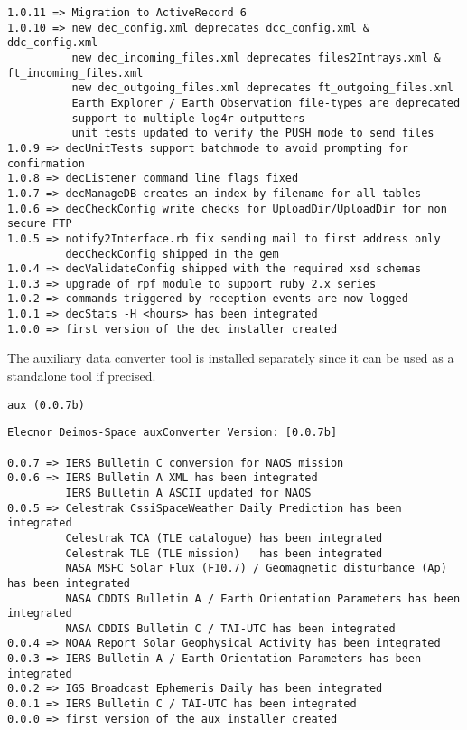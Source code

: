 \documentclass[dec_sum_main.tex]{subfiles}
\begin{document}
\begin{Verbatim}[tabsize=4]
1.0.11 => Migration to ActiveRecord 6
1.0.10 => new dec_config.xml deprecates dcc_config.xml & ddc_config.xml
          new dec_incoming_files.xml deprecates files2Intrays.xml & ft_incoming_files.xml
          new dec_outgoing_files.xml deprecates ft_outgoing_files.xml
          Earth Explorer / Earth Observation file-types are deprecated
          support to multiple log4r outputters
          unit tests updated to verify the PUSH mode to send files
1.0.9 => decUnitTests support batchmode to avoid prompting for confirmation
1.0.8 => decListener command line flags fixed
1.0.7 => decManageDB creates an index by filename for all tables
1.0.6 => decCheckConfig write checks for UploadDir/UploadDir for non secure FTP
1.0.5 => notify2Interface.rb fix sending mail to first address only 
         decCheckConfig shipped in the gem
1.0.4 => decValidateConfig shipped with the required xsd schemas
1.0.3 => upgrade of rpf module to support ruby 2.x series
1.0.2 => commands triggered by reception events are now logged
1.0.1 => decStats -H <hours> has been integrated
1.0.0 => first version of the dec installer created
\end{Verbatim}

\par
\noindent 
The auxiliary data converter tool is installed separately since it can be used as a standalone tool if precised. \newline


\begin{Verbatim}[tabsize=4]
    aux (0.0.7b)
\end{Verbatim}


\begin{Verbatim}[tabsize=4]
Elecnor Deimos-Space auxConverter Version: [0.0.7b]

0.0.7 => IERS Bulletin C conversion for NAOS mission
0.0.6 => IERS Bulletin A XML has been integrated
         IERS Bulletin A ASCII updated for NAOS
0.0.5 => Celestrak CssiSpaceWeather Daily Prediction has been integrated
         Celestrak TCA (TLE catalogue) has been integrated
         Celestrak TLE (TLE mission)   has been integrated
         NASA MSFC Solar Flux (F10.7) / Geomagnetic disturbance (Ap) has been integrated
         NASA CDDIS Bulletin A / Earth Orientation Parameters has been integrated
         NASA CDDIS Bulletin C / TAI-UTC has been integrated
0.0.4 => NOAA Report Solar Geophysical Activity has been integrated
0.0.3 => IERS Bulletin A / Earth Orientation Parameters has been integrated
0.0.2 => IGS Broadcast Ephemeris Daily has been integrated
0.0.1 => IERS Bulletin C / TAI-UTC has been integrated
0.0.0 => first version of the aux installer created
\end{Verbatim}
\end{document}
